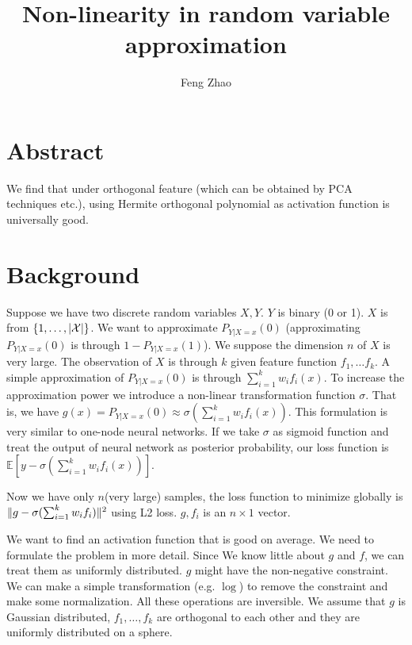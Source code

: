 \documentclass{article}
\title{Non-linearity in random variable approximation}
\author{Feng Zhao}
\DeclarePairedDelimiter\abs{\lvert}{\rvert}
\DeclarePairedDelimiter\norm{\lVert}{\rVert}
\def\E{\mathbb{E}}
\begin{document}
\maketitle
\section{Abstract}
We find that under orthogonal feature
(which can be obtained by PCA techniques etc.),
using Hermite orthogonal polynomial as activation function is
universally good.
\section{Background}
Suppose we have two discrete random variables $X, Y$. $Y$ is binary (0 or 1).
$X$ is from $\{1, \dots, \abs{\mathcal{X}}\}$.
We want to approximate $P_{Y|X=x}(0)$ (approximating $P_{Y|X=x}(0)$
is through $1-P_{Y|X=x}(1)$).
We suppose the dimension $n$ of $X$ is very large.
The observation of $X$ is through $k$ given feature function $f_1, \dots f_k$.
A simple approximation of $P_{Y|X=x}(0)$ is through
$ \sum_{i=1}^k w_i f_i(x)$.
To increase the approximation power
we introduce a non-linear transformation function
$ \sigma$. That is, we have
$g(x)  = P_{Y|X=x}(0) \approx \sigma(\sum_{i=1}^k w_i f_i(x))$.
This formulation is very similar to one-node neural networks.
If we take $\sigma$ as sigmoid function and
treat the output of neural network as
posterior probability,
our loss function is $ \E[y - \sigma(\sum_{i=1}^k w_i f_i(x))]$.

Now we have only $n$(very large) samples,
the loss function to minimize globally is
$\norm{g - \sigma(\sum_{i=1}^k w_i f_i)}^2$ using L2 loss.
$g, f_i$ is an $n\times 1 $ vector.

We want to find an activation function that is good on average.
We need to formulate the problem in more detail.
Since We know little about $g$ and $f$,
we can treat them as uniformly distributed.
$g$ might have the non-negative constraint.
We can make a simple transformation (e.g. $\log$)
to remove the constraint and make some normalization.
All these operations are inversible.
We assume that $g$ is Gaussian distributed, $f_1, \dots, f_k$ are
orthogonal to each other and they are uniformly distributed on a sphere.
\end{document}
